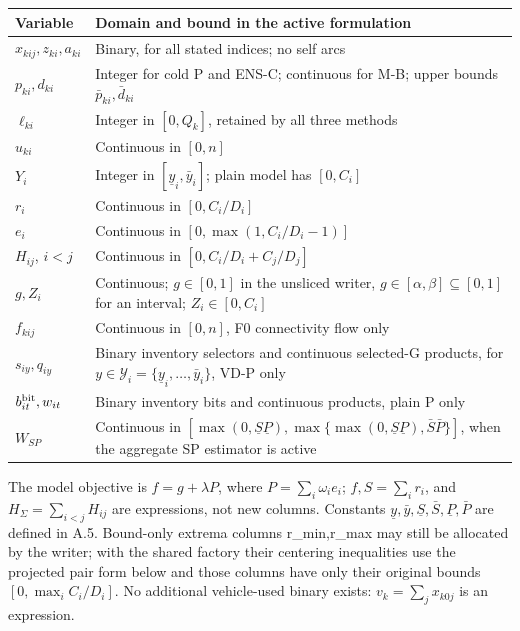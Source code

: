 \documentclass[
  american,
  11pt,
]{article}
\newcounter{none} %
\begin{document}
{\def\LTcaptype{none} %
\begin{longtable}[]{@{}
  >{\raggedright\arraybackslash}p{}
  >{\raggedright\arraybackslash}p{}@{}}
\toprule\noalign{}
\begin{minipage}[b]{\linewidth}\raggedright
Variable
\end{minipage} & \begin{minipage}[b]{\linewidth}\raggedright
Domain and bound in the active formulation
\end{minipage} \\
\midrule\noalign{}
\endhead
\bottomrule\noalign{}
\endlastfoot
\(x_{kij},z_{ki},a_{ki}\) & Binary, for all stated indices; no self
arcs \\
\(p_{ki},d_{ki}\) & Integer for cold P and ENS-C; continuous for M-B;
upper bounds \(\bar p_{ki},\bar d_{ki}\) \\
\(\ell_{ki}\) & Integer in \([0,Q_k]\), retained by all three methods \\
\(u_{ki}\) & Continuous in \([0,n]\) \\
\(Y_i\) & Integer in \([\underline y_i,\bar y_i]\); plain model has
\([0,C_i]\) \\
\(r_i\) & Continuous in \([0,C_i/D_i]\) \\
\(e_i\) & Continuous in \([0,\max(1,C_i/D_i-1)]\) \\
\(H_{ij}\), \(i<j\) & Continuous in \([0,C_i/D_i+C_j/D_j]\) \\
\(g,Z_i\) & Continuous; \(g\in[0,1]\) in the unsliced writer,
\(g\in[\alpha,\beta]\subseteq[0,1]\) for an interval;
\(Z_i\in[0,C_i]\) \\
\(f_{kij}\) & Continuous in \([0,n]\), F0 connectivity flow only \\
\(s_{iy},q_{iy}\) & Binary inventory selectors and continuous selected-G
products, for \(y\in\mathcal Y_i=\{\underline y_i,\ldots,\bar y_i\}\),
VD-P only \\
\(b_{it}^{\rm bit},w_{it}\) & Binary inventory bits and continuous
products, plain P only \\
\(W_{SP}\) & Continuous in
\([\max(0,\underline S\underline P),\max\{\max(0,\underline S\underline P),\bar S\bar P\}]\),
when the aggregate SP estimator is active \\
\end{longtable}
}

The model objective is \(f=g+\lambda P\), where
\(P=\sum_i\omega_i e_i\); \(f,S=\sum_i r_i\), and
\(H_\Sigma=\sum_{i<j}H_{ij}\) are expressions, not new columns.
Constants
\(\underline y,\bar y,\underline S,\bar S,\underline P,\bar P\) are
defined in A.5. Bound-only extrema columns r\_\allowbreak{}min,r\_\allowbreak{}max may still be
allocated by the writer; with the shared factory their centering
inequalities use the projected pair form below and those columns have
only their original bounds \([0,\max_i C_i/D_i]\). No additional
vehicle-used binary exists: \(v_k=\sum_jx_{k0j}\) is an expression.
\end{document}
